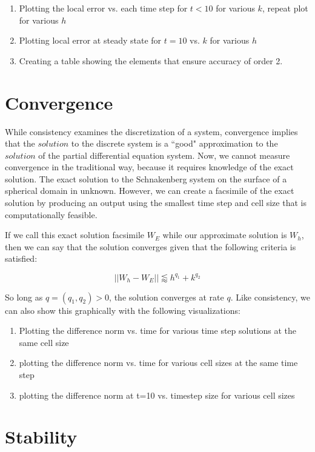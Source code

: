 \documentclass[12pt]{article}
\begin{document}
\begin{enumerate}
	\item Plotting the local error vs. each time step for $t<10$ for various $k$, repeat plot for various $h$
	\item Plotting local error at steady state for $t=10$ vs. $k$ for various $h$
	\item Creating a table showing the elements that ensure accuracy of order 2.
\end{enumerate}

\section{Convergence}

While consistency examines the discretization of a system, convergence implies that the $solution$ to the discrete system is a ``good" approximation to the $solution$ of the partial differential equation system. Now, we cannot measure convergence in the traditional way, because it requires knowledge of the exact solution. The exact solution to the Schnakenberg system on the surface of a spherical domain in unknown. However, we can create a facsimile of the exact solution by producing an output using the smallest time step and cell size that is computationally feasible. 

If we call this exact solution facsimile $W_E$ while our approximate solution is $W_h$, then we can say that the solution converges given that the following criteria is satisfied:

\begin{equation}
	||W_h - W_E|| \lessapprox h^{q_1} + k^{q_2}
\end{equation}

So long as $q=(q_1,q_2) > 0$, the solution converges at rate $q$. Like consistency, we can also show this graphically with the following visualizations:

\begin{enumerate}
	\item Plotting the difference norm vs. time for various time step solutions at the same cell size
	\item plotting the difference norm vs. time for various cell sizes at the same time step
	\item plotting the difference norm at t=10 vs. timestep size for various cell sizes
\end{enumerate}


\section{Stability}
\end{document}
